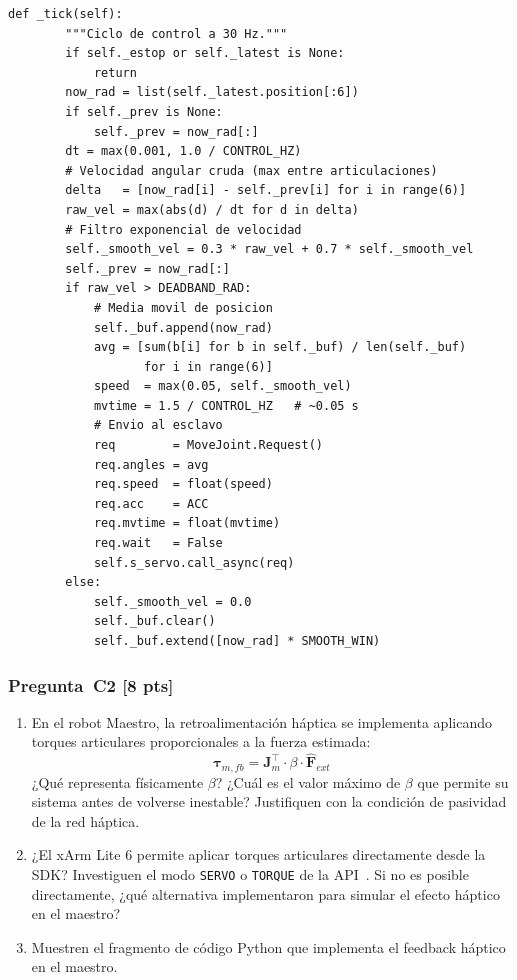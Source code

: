\documentclass[journal,10pt,twoside]{IEEEtran}
\newcommand{\pts}[1]{\textbf{\color{tec_red}[#1 pts]}}
\begin{document}
\begin{lstlisting}[caption={Ciclo de control del robot Esclavo -- implementacion real},
                   label={lst:slave}]
    def _tick(self):
        """Ciclo de control a 30 Hz."""
        if self._estop or self._latest is None:
            return
        now_rad = list(self._latest.position[:6])
        if self._prev is None:
            self._prev = now_rad[:]
        dt = max(0.001, 1.0 / CONTROL_HZ)
        # Velocidad angular cruda (max entre articulaciones)
        delta   = [now_rad[i] - self._prev[i] for i in range(6)]
        raw_vel = max(abs(d) / dt for d in delta)
        # Filtro exponencial de velocidad
        self._smooth_vel = 0.3 * raw_vel + 0.7 * self._smooth_vel
        self._prev = now_rad[:]
        if raw_vel > DEADBAND_RAD:
            # Media movil de posicion
            self._buf.append(now_rad)
            avg = [sum(b[i] for b in self._buf) / len(self._buf)
                   for i in range(6)]
            speed  = max(0.05, self._smooth_vel)
            mvtime = 1.5 / CONTROL_HZ   # ~0.05 s
            # Envio al esclavo
            req        = MoveJoint.Request()
            req.angles = avg
            req.speed  = float(speed)
            req.acc    = ACC
            req.mvtime = float(mvtime)
            req.wait   = False
            self.s_servo.call_async(req)
        else:
            self._smooth_vel = 0.0
            self._buf.clear()
            self._buf.extend([now_rad] * SMOOTH_WIN)
\end{lstlisting}

\subsubsection*{Pregunta~C2 \pts{8}}
\begin{enumerate}[label=(\alph*)]
  \item En el robot Maestro, la retroalimentación háptica se implementa
        aplicando torques articulares proporcionales a la fuerza estimada:
        \[
          \bm{\tau}_{m,fb} = \bm{J}_m^\top \cdot \beta \cdot \hat{\bm{F}}_{ext}
        \]
        ¿Qué representa físicamente $\beta$?
        ¿Cuál es el valor máximo de $\beta$ que permite su sistema
        antes de volverse inestable?
        Justifiquen con la condición de pasividad de la red háptica.
  \item ¿El xArm Lite 6 permite aplicar torques articulares directamente
        desde la SDK? Investiguen el modo \texttt{SERVO} o
        \texttt{TORQUE} de la API~\cite{xarm_github}.
        Si no es posible directamente, ¿qué alternativa implementaron
        para simular el efecto háptico en el maestro?
  \item Muestren el fragmento de código Python que implementa el
        feedback háptico en el maestro.
\end{enumerate}
\end{document}
